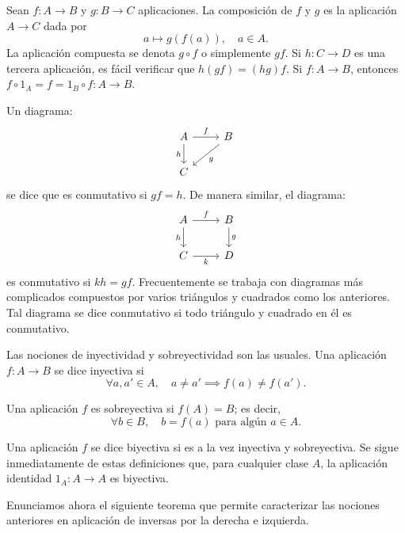 Sean \( f: A \to B \) y \( g: B \to C \) aplicaciones. La {composición} de \( f \) y \( g \) es la aplicación \( A \to C \) dada por
\[
a \mapsto g(f(a)), \quad a \in A.
\]
La aplicación compuesta se denota \( g \circ f \) o simplemente \( gf \). Si \( h: C \to D \) es una tercera aplicación, es fácil verificar que \( h(gf) = (hg)f \). Si \( f: A \to B \), entonces \( f \circ 1_A = f = 1_B \circ f: A \to B \).

Un diagrama:
\[
    \begin{tikzcd}
    A \arrow{r}{f} \arrow[swap]{d}{h} & B \arrow{dl}{g} \\
    C
  \end{tikzcd}
\]
se dice que es conmutativo si \( gf = h \). De manera similar, el diagrama:
\[
\begin{tikzcd}
    A \arrow{r}{f} \arrow[swap]{d}{h} & B \arrow{d}{g} \\
    C \arrow[swap]{r}{k} & D 
  \end{tikzcd}
\]
es conmutativo si \( kh = gf \). Frecuentemente se trabaja con diagramas más complicados compuestos por varios triángulos y cuadrados como los anteriores. Tal diagrama se dice conmutativo si todo triángulo y cuadrado en él es conmutativo.

Las nociones de inyectividad y sobreyectividad son las usuales. Una aplicación \( f: A \to B \) se dice inyectiva si
\[
\forall a, a' \in A, \quad a \neq a' \implies f(a) \neq f(a').
\]

Una aplicación \( f \) es sobreyectiva si \( f(A) = B \); es decir,
\[
\forall b \in B, \quad b = f(a) \text{ para algún } a \in A.
\]

Una aplicación \( f \) se dice biyectiva si es a la vez inyectiva y sobreyectiva. Se sigue inmediatamente de estas definiciones que, para cualquier clase \( A \), la aplicación identidad \( 1_A: A \to A \) es biyectiva.

Enunciamos ahora el siguiente teorema que permite caracterizar las nociones anteriores en aplicación de inversas por la derecha e izquierda.


